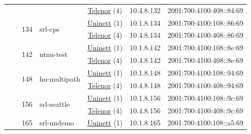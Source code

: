 \begin{small}
\begin{center}
\begin{longtable}{|c|c|c|c|c|c|c|c|}
  &  &  &  & \multicolumn{2}{|c|}{\tiny{\href{https://www.telenor.no}{Telenor} (4)}} & \tiny{10.4.8.132} & \tiny{2001:700:4100:408::84:69} \\* \cline{3-3}\cline{4-4}\cline{5-5}\cline{6-6}\cline{7-7}\cline{8-8}
  &  & \multirow{2}{*}{\tiny{134}} & \multicolumn{1}{|l|}{\multirow{2}{*}{\tiny{srl-cps}}} & \multicolumn{2}{|c|}{\tiny{\href{https://www.uninett.no}{Uninett} (1)}} & \tiny{10.1.8.134} & \tiny{2001:700:4100:108::86:69} \\* \cline{5-5}\cline{6-6}\cline{7-7}\cline{8-8}
  &  &  &  & \multicolumn{2}{|c|}{\tiny{\href{https://www.telenor.no}{Telenor} (4)}} & \tiny{10.4.8.134} & \tiny{2001:700:4100:408::86:69} \\* \cline{3-3}\cline{4-4}\cline{5-5}\cline{6-6}\cline{7-7}\cline{8-8}
  &  & \multirow{2}{*}{\tiny{142}} & \multicolumn{1}{|l|}{\multirow{2}{*}{\tiny{ntnu-test}}} & \multicolumn{2}{|c|}{\tiny{\href{https://www.uninett.no}{Uninett} (1)}} & \tiny{10.1.8.142} & \tiny{2001:700:4100:108::8e:69} \\* \cline{5-5}\cline{6-6}\cline{7-7}\cline{8-8}
  &  &  &  & \multicolumn{2}{|c|}{\tiny{\href{https://www.telenor.no}{Telenor} (4)}} & \tiny{10.4.8.142} & \tiny{2001:700:4100:408::8e:69} \\* \cline{3-3}\cline{4-4}\cline{5-5}\cline{6-6}\cline{7-7}\cline{8-8}
  &  & \multirow{2}{*}{\tiny{148}} & \multicolumn{1}{|l|}{\multirow{2}{*}{\tiny{hu-multipath}}} & \multicolumn{2}{|c|}{\tiny{\href{https://www.uninett.no}{Uninett} (1)}} & \tiny{10.1.8.148} & \tiny{2001:700:4100:108::94:69} \\* \cline{5-5}\cline{6-6}\cline{7-7}\cline{8-8}
  &  &  &  & \multicolumn{2}{|c|}{\tiny{\href{https://www.telenor.no}{Telenor} (4)}} & \tiny{10.4.8.148} & \tiny{2001:700:4100:408::94:69} \\* \cline{3-3}\cline{4-4}\cline{5-5}\cline{6-6}\cline{7-7}\cline{8-8}
  &  & \multirow{2}{*}{\tiny{156}} & \multicolumn{1}{|l|}{\multirow{2}{*}{\tiny{srl-seattle}}} & \multicolumn{2}{|c|}{\tiny{\href{https://www.uninett.no}{Uninett} (1)}} & \tiny{10.1.8.156} & \tiny{2001:700:4100:108::9c:69} \\* \cline{5-5}\cline{6-6}\cline{7-7}\cline{8-8}
  &  &  &  & \multicolumn{2}{|c|}{\tiny{\href{https://www.telenor.no}{Telenor} (4)}} & \tiny{10.4.8.156} & \tiny{2001:700:4100:408::9c:69} \\* \cline{3-3}\cline{4-4}\cline{5-5}\cline{6-6}\cline{7-7}\cline{8-8}
  &  & \multirow{2}{*}{\tiny{165}} & \multicolumn{1}{|l|}{\multirow{2}{*}{\tiny{srl-nndemo}}} & \multicolumn{2}{|c|}{\tiny{\href{https://www.uninett.no}{Uninett} (1)}} & \tiny{10.1.8.165} & \tiny{2001:700:4100:108::a5:69} \\* \cline{5-5}\cline{6-6}\cline{7-7}\cline{8-8}

\end{longtable}
\end{center}
\end{small}
